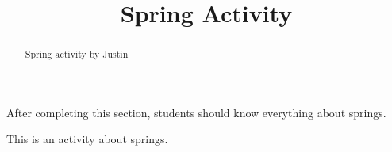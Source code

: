 \documentclass{ximera}
\title{Spring Activity}
\begin{document}
\begin{abstract}
Spring activity by Justin
\end{abstract}


After completing this section, students should know everything about springs.




\maketitle

This is an activity about springs.
\end{document}
